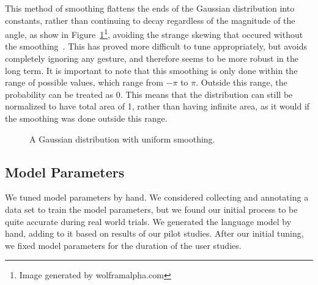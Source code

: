 \documentclass[a4paper, 11pt]{article} %
\begin{document}
This method of smoothing flattens the ends of the Gaussian distribution into constants, rather than continuing to decay regardless of the magnitude of the angle, as show in Figure~\ref{fig:gauss}\footnote{Image generated by wolframalpha.com}, avoiding the strange skewing that occured without the smoothing~\citep{thrun08}. This has proved more difficult to tune appropriately, but avoids completely ignoring any gesture, and therefore seems to be more robust in the long term. It is important to note that this smoothing is only done within the range of possible values, which range from $-\pi$ to $\pi$. Outside this range, the probability can be treated as 0. This means that the distribution can still be normalized to have total area of 1, rather than having infinite area, as it would if the smoothing was done outside this range.
\begin{figure}[h]
\centering
{}
\caption{A Gaussian distribution with uniform smoothing.\label{fig:gauss}}
\end{figure}
\subsection{Model Parameters}
We tuned model parameters by hand. We considered collecting and annotating a data set to train the model parameters, but we found our initial process to be quite accurate during real world trials. We generated the language model by hand, adding to it based on results of our pilot studies. After our initial tuning, we fixed model parameters for the duration of the user studies. 
\end{document}
